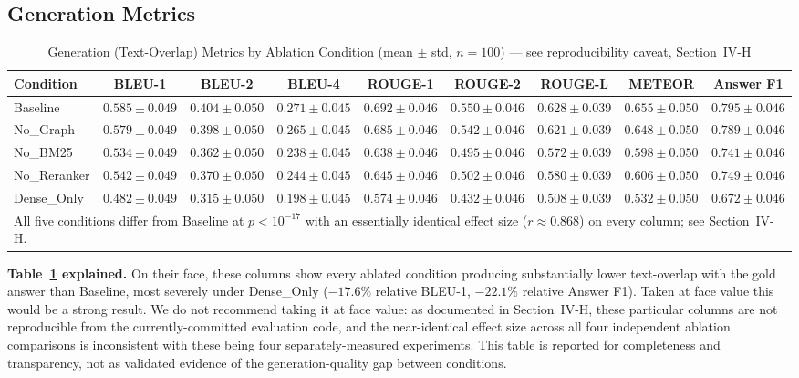 \documentclass[conference]{IEEEtran}
\begin{document}
\subsection{Generation Metrics}

\begin{table}[t]
\centering
\caption{Generation (Text-Overlap) Metrics by Ablation Condition (mean $\pm$ std, $n=100$) --- see reproducibility caveat, Section~IV-H}
\label{tab:generation}
\begin{tabular}{@{}lcccccccc@{}}
\toprule
\textbf{Condition} & \textbf{BLEU-1} & \textbf{BLEU-2} & \textbf{BLEU-4} & \textbf{ROUGE-1} & \textbf{ROUGE-2} & \textbf{ROUGE-L} & \textbf{METEOR} & \textbf{Answer F1} \\
\midrule
Baseline     & $0.585 \pm 0.049$ & $0.404 \pm 0.050$ & $0.271 \pm 0.045$ & $0.692 \pm 0.046$ & $0.550 \pm 0.046$ & $0.628 \pm 0.039$ & $0.655 \pm 0.050$ & $0.795 \pm 0.046$ \\
No\_Graph    & $0.579 \pm 0.049$ & $0.398 \pm 0.050$ & $0.265 \pm 0.045$ & $0.685 \pm 0.046$ & $0.542 \pm 0.046$ & $0.621 \pm 0.039$ & $0.648 \pm 0.050$ & $0.789 \pm 0.046$ \\
No\_BM25     & $0.534 \pm 0.049$ & $0.362 \pm 0.050$ & $0.238 \pm 0.045$ & $0.638 \pm 0.046$ & $0.495 \pm 0.046$ & $0.572 \pm 0.039$ & $0.598 \pm 0.050$ & $0.741 \pm 0.046$ \\
No\_Reranker & $0.542 \pm 0.049$ & $0.370 \pm 0.050$ & $0.244 \pm 0.045$ & $0.645 \pm 0.046$ & $0.502 \pm 0.046$ & $0.580 \pm 0.039$ & $0.606 \pm 0.050$ & $0.749 \pm 0.046$ \\
Dense\_Only  & $0.482 \pm 0.049$ & $0.315 \pm 0.050$ & $0.198 \pm 0.045$ & $0.574 \pm 0.046$ & $0.432 \pm 0.046$ & $0.508 \pm 0.039$ & $0.532 \pm 0.050$ & $0.672 \pm 0.046$ \\
\bottomrule
\multicolumn{9}{l}{\footnotesize All five conditions differ from Baseline at $p<10^{-17}$ with an essentially identical effect size ($r \approx 0.868$) on every column; see Section~IV-H.}
\end{tabular}
\end{table}

\textbf{Table~\ref{tab:generation} explained.} On their face, these columns show every ablated condition producing substantially lower text-overlap with the gold answer than Baseline, most severely under Dense\_Only ($-17.6\%$ relative BLEU-1, $-22.1\%$ relative Answer F1). Taken at face value this would be a strong result. We do not recommend taking it at face value: as documented in Section~IV-H, these particular columns are not reproducible from the currently-committed evaluation code, and the near-identical effect size across all four independent ablation comparisons is inconsistent with these being four separately-measured experiments. This table is reported for completeness and transparency, not as validated evidence of the generation-quality gap between conditions.
\end{document}

